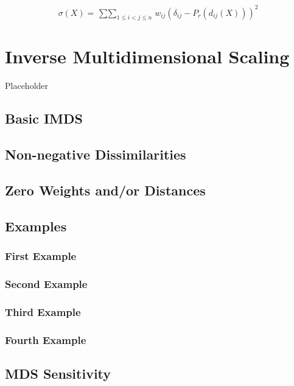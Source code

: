 \documentclass[
  12pt,
]{book}
\begin{document}
\[
\sigma(X)=\mathop{\sum\sum}_{1\leq i<j\leq n}w_{ij}(\delta_{ij}-P_r(d_{ij}(X)))^2
\]

\chapter{Inverse Multidimensional Scaling}\label{chinverse}

Placeholder

\section{Basic IMDS}\label{basic-imds}

\section{Non-negative Dissimilarities}\label{non-negative-dissimilarities}

\section{Zero Weights and/or Distances}\label{zero-weights-andor-distances}

\section{Examples}\label{examples-2}

\subsection{First Example}\label{first-example}

\subsection{Second Example}\label{second-example}

\subsection{Third Example}\label{third-example}

\subsection{Fourth Example}\label{fourth-example}

\section{MDS Sensitivity}\label{mds-sensitivity}
\end{document}
